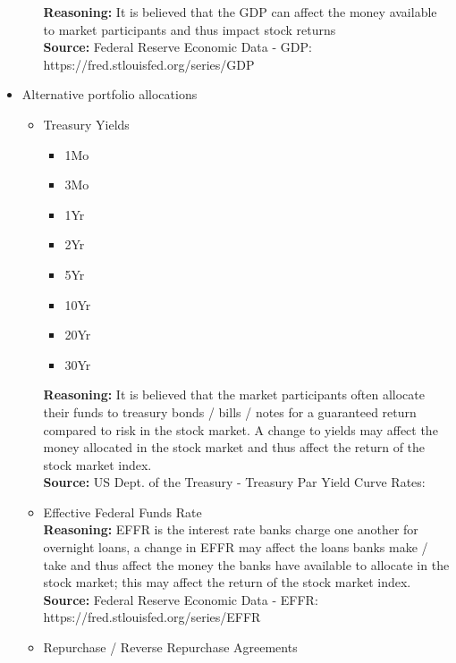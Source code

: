 \begin{itemize}
\begin{itemize}
        \textbf{Reasoning:} It is believed that the GDP can affect the money available to market
        participants and thus impact stock returns\\
        \textbf{Source:} Federal Reserve Economic Data - GDP:\\
        https://fred.stlouisfed.org/series/GDP
    \end{itemize}
    \item Alternative portfolio allocations
    \begin{itemize}
        \item Treasury Yields
        \begin{itemize}
            \item 1Mo
            \item 3Mo
            \item 1Yr
            \item 2Yr
            \item 5Yr
            \item 10Yr
            \item 20Yr
            \item 30Yr
        \end{itemize}
        \textbf{Reasoning:} It is believed that the market participants often allocate their funds
        to treasury bonds / bills / notes for a guaranteed return compared to risk in the stock market.
        A change to yields may affect the money allocated in the stock market and thus affect the
        return of the stock market index.\\
        \textbf{Source:} US Dept. of the Treasury - Treasury Par Yield Curve Rates:\\
        \item Effective Federal Funds Rate\\
        \textbf{Reasoning:} EFFR is the interest rate banks charge one another for overnight loans, a change in
        EFFR may affect the loans banks make / take and thus affect the money the banks have available to allocate
        in the stock market; this may affect the return of the stock market index.\\
        \textbf{Source:} Federal Reserve Economic Data - EFFR:\\
        https://fred.stlouisfed.org/series/EFFR
        \item Repurchase / Reverse Repurchase Agreements\\

\end{itemize}
\end{itemize}
